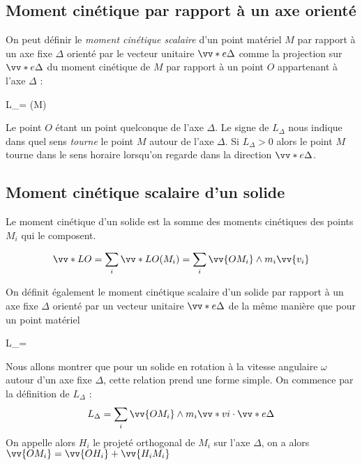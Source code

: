 \documentclass{cours}
\begin{document}
\subsection{Moment cinétique par rapport à un axe orienté}%
\label{sub:moment_cinetique_par_rapport_a_un_axe_oriente}

On peut définir le \emph{moment cinétique scalaire} d'un point matériel $M$ par rapport à un axe fixe $\Delta$ orienté par le vecteur unitaire $\vv*{e}{\Delta}$ comme la projection sur $\vv*{e}{\Delta}$ du moment cinétique de $M$ par rapport à un point $O$ appartenant à l'axe $\Delta$ : 
\begin{eqencadre}
  L_\Delta = (M)\cdot{}
\end{eqencadre}
Le point $O$ étant un point quelconque de l'axe $\Delta$. Le signe de $L_\Delta$ nous indique dans quel sens \emph{tourne} le point $M$ autour de l'axe $\Delta$. Si $L_\Delta>0$ alors le point $M$ tourne dans le sens horaire lorsqu'on regarde dans la direction $\vv*{e}{\Delta}$.   

\subsection{Moment cinétique scalaire d'un solide}%
\label{sub:moment_cinetique_scalaire_d_un_solide}

Le moment cinétique d'un solide est la somme des moments cinétiques des points $M_i$ qui le composent. 

\begin{equation}
  \vv*{L}{O} = \sum_i \vv*{L}{O}(M_i) = \sum_i \vv{OM_i} \wedge m_i\vv{v_i}
\end{equation}

On définit également le moment cinétique scalaire d'un solide par rapport à un axe fixe $\Delta$ orienté par un vecteur unitaire $\vv*{e}{\Delta}$ de la même manière que pour un point matériel

\begin{eqencadre}
  L_\Delta =  \cdot {}
\end{eqencadre}

Nous allons montrer que pour un solide en rotation à la vitesse angulaire $\omega$ autour d'un axe fixe $\Delta$, cette relation prend une forme simple. On commence par la définition de $L_{\Delta}$ :
\begin{equation}
  L_\Delta = \sum_i \vv{OM_i}\wedge m_i\vv*{v}{i} \cdot \vv*{e}{\Delta}
\end{equation}
On appelle alors $H_i$ le projeté orthogonal de $M_i$ sur l'axe $\Delta$, on a alors $\vv{OM_i} = \vv{OH_i} + \vv{H_iM_i}$ 
\end{document}

